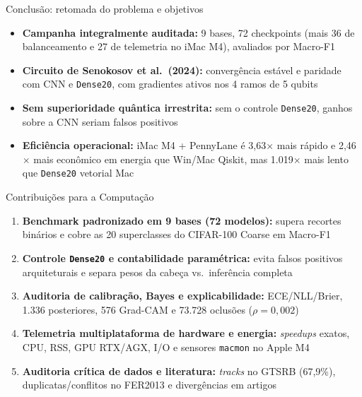 \documentclass[aspectratio=169,11pt,brazil]{beamer}
\begin{document}
\begin{frame}{Conclusão: retomada do problema e objetivos}
  \footnotesize
  \begin{itemize}\setlength{\itemsep}{8pt}
    \item \textbf{Campanha integralmente auditada:} 9 bases, 72 checkpoints (mais 36 de balanceamento e 27 de telemetria no iMac M4), avaliados por Macro-F1
    \item \textbf{Circuito de Senokosov et al.\ (2024):} convergência estável e paridade com CNN e \texttt{Dense20}, com gradientes ativos nos 4 ramos de 5 qubits
    \item \textbf{Sem superioridade quântica irrestrita:} sem o controle \texttt{Dense20}, ganhos sobre a CNN seriam falsos positivos
    \item \textbf{Eficiência operacional:} iMac M4 + PennyLane é 3,63$\times$ mais rápido e 2,46$\times$ mais econômico em energia que Win/Mac Qiskit, mas 1.019$\times$ mais lento que \texttt{Dense20} vetorial Mac
  \end{itemize}
\end{frame}

\begin{frame}{Contribuições para a Computação}
  \footnotesize
  \begin{enumerate}\setlength{\itemsep}{6pt}
    \item \textbf{Benchmark padronizado em 9 bases (72 modelos):} supera recortes binários e cobre as 20 superclasses do CIFAR-100 Coarse em Macro-F1
    \item \textbf{Controle \texttt{Dense20} e contabilidade paramétrica:} evita falsos positivos arquiteturais e separa pesos da cabeça vs.\ inferência completa
    \item \textbf{Auditoria de calibração, Bayes e explicabilidade:} ECE/NLL/Brier, 1.336 posteriores, 576 Grad-CAM e 73.728 oclusões ($\rho = 0{,}002$)
    \item \textbf{Telemetria multiplataforma de hardware e energia:} \textit{speedups} exatos, CPU, RSS, GPU RTX/AGX, I/O e sensores \texttt{macmon} no Apple M4
    \item \textbf{Auditoria crítica de dados e literatura:} \textit{tracks} no GTSRB (67,9\%), duplicatas/conflitos no FER2013 e divergências em artigos
  \end{enumerate}
\end{frame}
\end{document}
